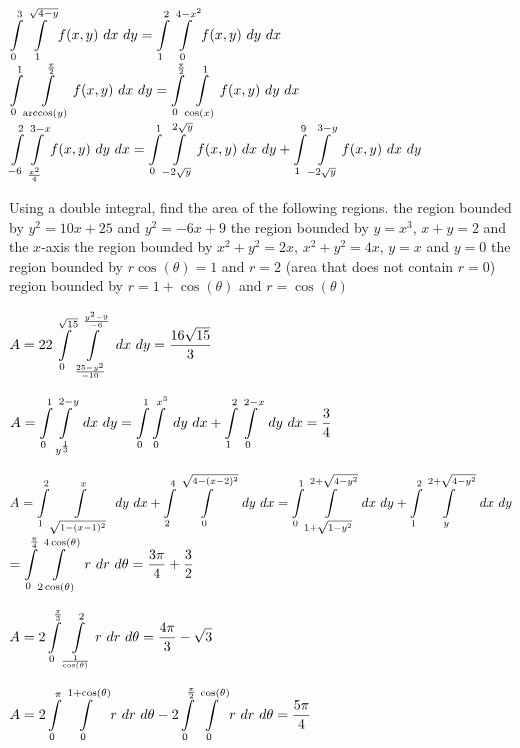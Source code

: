 \begin{Answer}
    
         \Question $\displaystyle \int\limits_{0}^3\int\limits_{1}^{\sqrt{4-y}} f(x,y)\ dx\ dy = \displaystyle \int\limits_{1}^2\int\limits_{0}^{4-x^2} f(x,y)\ dy\ dx$
         \Question $\ds \int\limits_{0}^1\int\limits_{\arccos(y)}^{\frac{\pi}{2}} f(x,y)\ dx\ dy = \ds \int\limits_{0}^{\frac{\pi}{2}}\int\limits_{\cos(x)}^{1} f(x,y)\ dy\ dx$
         \Question $\ds \int\limits_{-6}^2\int\limits_{\frac{x^2}{4}}^{3-x} f(x,y)\ dy\ dx = \ds \int\limits_{0}^1\int\limits_{-2\sqrt{y}}^{2\sqrt{y}} f(x,y)\ dx\ dy + \ds \int\limits_{1}^9\int\limits_{-2\sqrt{y}}^{3-y} f(x,y)\ dx\ dy$
        
    
\end{Answer}
    
\begin{Exercise} Using a double integral, find the area of the following regions.
        \Question[difficulty = 1] the region bounded by $y^2=10x+25$ and $y^2 = -6x+9$
        \Question[difficulty = 1] the region bounded by $y=x^3$, $x+y=2$ and the $x$-axis
        \Question[difficulty = 3] the region bounded by $x^2+y^2=2x$, $x^2+y^2 = 4x$, $y=x$ and $y=0$
        \Question[difficulty = 2] the region bounded by $r\cos (\theta) = 1$ and $r=2$ (area that does not contain $r = 0$)
        \Question[difficulty = 3] region bounded by $r= 1 +\cos (\theta)$ and $r=\cos (\theta)$ 
\end{Exercise}

\begin{Answer}
    
        \Question $A = 2 \displaystyle 2\int\limits_{0}^{\sqrt{15}}\int\limits_{\frac{25-y^2}{-10}}^{\frac{y^2-9}{-6}} \ dx\ dy = \dfrac{16 \sqrt{15}}{3}$
        
        \Question $A = \displaystyle \int\limits_{0}^{1}\int\limits_{y^{\frac{1}{3}}}^{2-y} \ dx\ dy =\displaystyle \int\limits_{0}^{1}\int\limits_{0}^{x^3} \ dy\ dx + \displaystyle \int\limits_{1}^{2}\int\limits_{0}^{2-x} \ dy\ dx  = \dfrac{3}{4}$
    
        \Question $A = \ds \int\limits_{1}^{2}\int\limits_{\sqrt{1-(x-1)^2}}^{x} \ dy\ dx + \ds \int\limits_{2}^{4}\int\limits_{0}^{\sqrt{4-(x-2)^2}} \ dy\ dx = 
        \ds \int\limits_{0}^{1}\int\limits_{1+\sqrt{1-y^2}}^{2+\sqrt{4-y^2}} \ dx\ dy + \ds \int\limits_{1}^{2}\int\limits_{y}^{2+\sqrt{4-y^2}} \ dx\ dy $ \\[0.2cm]
        $= \displaystyle \int \limits_0^{\frac{\pi}{4}} \int\limits_{2 \cos(\theta)}^{4\cos(\theta)} \ r \ dr \ d\theta= \dfrac{3 \pi }{4} + \dfrac{3}{2} $
        
        \Question $A = 2 \displaystyle \int\limits_{0}^{\frac{\pi}{3}}\int\limits_{\frac{1}{\cos (\theta)}}^{2} r\ dr\ d\theta = \dfrac{4 \pi }{3} - \sqrt{3}$
        
        \Question $A = 2 \ds \int\limits_{0}^{\pi}\int\limits_{0}^{1 + \cos(\theta)} r\ dr\ d\theta - 2 \ds \int\limits_{0}^{\frac{\pi}{2}}\int\limits_{0}^{\cos(\theta)} r\ dr\ d\theta = \dfrac{5 \pi }{4}$
    
\end{Answer}    


